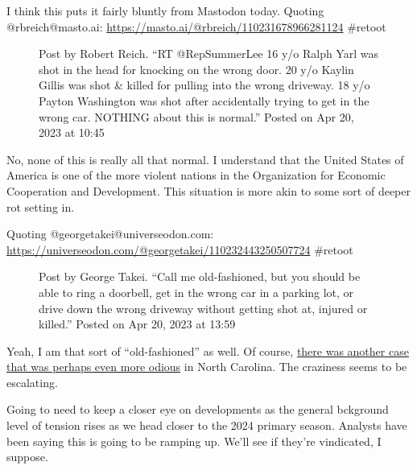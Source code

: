 I think this puts it fairly bluntly from Mastodon today. Quoting
@rbreich@masto.ai: \url{https://masto.ai/@rbreich/110231678966281124}
\#retoot

\begin{figure}
\centering
{}
\caption{Post by Robert Reich. ``RT @RepSummerLee 16 y/o Ralph Yarl was
shot in the head for knocking on the wrong door. 20 y/o Kaylin Gillis
was shot \& killed for pulling into the wrong driveway. 18 y/o Payton
Washington was shot after accidentally trying to get in the wrong car.
NOTHING about this is normal.'' Posted on Apr 20, 2023 at 10:45}
\end{figure}

No, none of this is really all that normal. I understand that the United
States of America is one of the more violent nations in the Organization
for Economic Cooperation and Development. This situation is more akin to
some sort of deeper rot setting in.

Quoting @georgetakei@universeodon.com:
\url{https://universeodon.com/@georgetakei/110232443250507724} \#retoot

\begin{figure}
\centering
{}
\caption{Post by George Takei. ``Call me old-fashioned, but you should
be able to ring a doorbell, get in the wrong car in a parking lot, or
drive down the wrong driveway without getting shot at, injured or
killed.'' Posted on Apr 20, 2023 at 13:59}
\end{figure}

Yeah, I am that sort of ``old-fashioned'' as well. Of course,
\href{https://web.archive.org/web/20230420184653/https://abcnews.go.com/US/6-year-parents-neighbor-shot-after-basketball-rolls/story?id=98717589}{there
was another case that was perhaps even more odious} in North Carolina.
The craziness seems to be escalating.

Going to need to keep a closer eye on developments as the general
bckground level of tension rises as we head closer to the 2024 primary
season. Analysts have been saying this is going to be ramping up. We'll
see if they're vindicated, I suppose.
